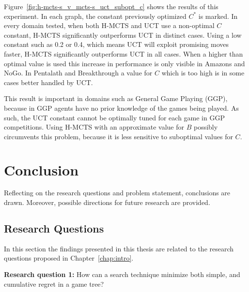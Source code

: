 \documentclass{kecsmstr}
\begin{document}
Figure~\ref{fig:h-mcts-s_v_mcts-s_uct_subopt_c} shows the results of this experiment. In each graph, the constant previously optimized $C^*$ is marked. In every domain tested, when both H-MCTS and UCT use a non-optimal $C$ constant, H-MCTS significantly outperforms UCT in distinct cases. Using a low constant such as 0.2 or 0.4, which means UCT will exploit promising moves faster, H-MCTS significantly outperforms UCT in all cases. When a higher than optimal value is used this increase in performance is only visible in Amazons and NoGo. In Pentalath and Breakthrough a value for $C$ which is too high is in some cases better handled by UCT.

This result is important in domains such as General Game Playing (GGP), because in GGP agents have no prior knowledge of the games being played. As such, the UCT constant cannot be optimally tuned for each game in GGP competitions. Using H-MCTS with an approximate value for $B$ possibly circumvents this problem, because it is less sensitive to suboptimal values for $C$.

\chapter{Conclusion}
\label{chap:conclusion}
\begin{chaptercontents}
Reflecting on the research questions and problem statement, conclusions are drawn. Moreover, possible directions for future research are provided.
\end{chaptercontents}

\section{Research Questions}
In this section the findings presented in this thesis are related to the research questions proposed in Chapter~\ref{chap:intro}.

\vspace{2mm}
\textbf{Research question 1:} How can a search technique minimize both simple, and cumulative regret in a game tree?
\vspace{2mm}
\end{document}
